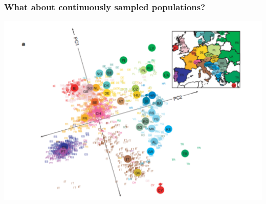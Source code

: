 \documentclass{beamer}
\begin{document}
\begin{frame}
\frametitle{What about continuously sampled populations?}
	\includegraphics[height = \textheight]{../Figs/Novembre.pdf}
\end{frame}
\end{document}
